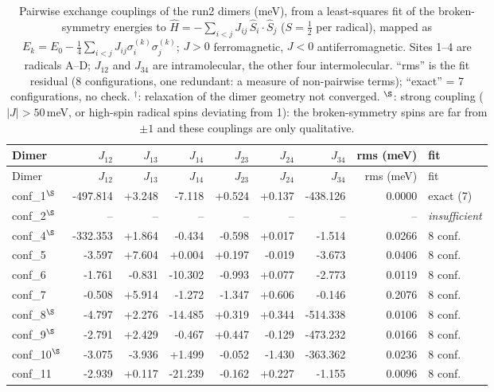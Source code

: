 
\begin{longtable}{@{}lrrrrrrrl@{}}
\caption{Pairwise exchange couplings of the run2 dimers (meV), from a least-squares fit of the
         broken-symmetry energies to $\hat H = -\sum_{i<j} J_{ij}\,\hat S_i\cdot\hat S_j$ ($S=\tfrac12$ per
         radical), mapped as $E_k=E_0-\tfrac14\sum_{i<j}J_{ij}\sigma_i^{(k)}\sigma_j^{(k)}$; $J>0$ ferromagnetic,
         $J<0$ antiferromagnetic. Sites 1--4 are radicals A--D; $J_{12}$ and $J_{34}$ are intramolecular,
         the other four intermolecular. ``rms'' is the fit residual (8 configurations, one
         redundant: a measure of non-pairwise terms); ``exact'' = 7 configurations, no check.
         $^{\dagger}$: relaxation of the dimer geometry not converged. $^{\S}$: strong coupling
         ($|J|>50$\,meV, or high-spin radical spins deviating from 1): the broken-symmetry
         spins are far from $\pm1$ and these couplings are only qualitative.}\label{tab:run2_exchange}\\
\toprule
Dimer & $J_{12}$ & $J_{13}$ & $J_{14}$ & $J_{23}$ & $J_{24}$ & $J_{34}$ & rms (meV) & fit \\
\midrule
\endfirsthead
\toprule
Dimer & $J_{12}$ & $J_{13}$ & $J_{14}$ & $J_{23}$ & $J_{24}$ & $J_{34}$ & rms (meV) & fit \\
\midrule
\endhead
\bottomrule
\endlastfoot
conf\_1$^{\S}$ & -497.814 & +3.248 & -7.118 & +0.524 & +0.137 & -438.126 & 0.0000 & exact (7) \\
conf\_2$^{\S}$ & -- & -- & -- & -- & -- & -- & -- & \textit{insufficient} \\
conf\_4$^{\S}$ & -332.353 & +1.864 & -0.434 & -0.598 & +0.017 & -1.514 & 0.0266 & 8 conf. \\
conf\_5 & -3.597 & +7.604 & +0.004 & +0.197 & -0.019 & -3.673 & 0.0406 & 8 conf. \\
conf\_6 & -1.761 & -0.831 & -10.302 & -0.993 & +0.077 & -2.773 & 0.0119 & 8 conf. \\
conf\_7 & -0.508 & +5.914 & -1.272 & -1.347 & +0.606 & -0.146 & 0.2076 & 8 conf. \\
conf\_8$^{\S}$ & -4.797 & +2.276 & -14.485 & +0.319 & +0.344 & -514.338 & 0.0106 & 8 conf. \\
conf\_9$^{\S}$ & -2.791 & +2.429 & -0.467 & +0.447 & -0.129 & -473.232 & 0.0166 & 8 conf. \\
conf\_10$^{\S}$ & -3.075 & -3.936 & +1.499 & -0.052 & -1.430 & -363.362 & 0.0236 & 8 conf. \\
conf\_11 & -2.939 & +0.117 & -21.239 & -0.162 & +0.227 & -1.155 & 0.0096 & 8 conf. \\

\end{longtable}
